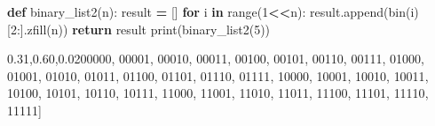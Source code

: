 \documentclass[
]{article}
\newenvironment{Shaded}{\begin{snugshade}}{\end{snugshade}}
\newcommand{\BuiltInTok}[1]{#1}
\newcommand{\ControlFlowTok}[1]{\textcolor[rgb]{0.13,0.29,0.53}{\textbf{#1}}}
\newcommand{\DecValTok}[1]{\textcolor[rgb]{0.00,0.00,0.81}{#1}}
\newcommand{\KeywordTok}[1]{\textcolor[rgb]{0.13,0.29,0.53}{\textbf{#1}}}
\newcommand{\NormalTok}[1]{#1}
\newcommand{\OperatorTok}[1]{\textcolor[rgb]{0.81,0.36,0.00}{\textbf{#1}}}
\newcommand{\StringTok}[1]{\textcolor[rgb]{0.31,0.60,0.02}{#1}}
\begin{document}
\begin{Shaded}
\begin{Highlighting}[]
\KeywordTok{def}\NormalTok{ binary\_list2(n):}
\NormalTok{    result }\OperatorTok{=}\NormalTok{ []}
    \ControlFlowTok{for}\NormalTok{ i }\KeywordTok{in} \BuiltInTok{range}\NormalTok{(}\DecValTok{1}\OperatorTok{\textless{}\textless{}}\NormalTok{n):}
\NormalTok{        result.append(}\BuiltInTok{bin}\NormalTok{(i)[}\DecValTok{2}\NormalTok{:].zfill(n))}
    \ControlFlowTok{return}\NormalTok{ result}
\BuiltInTok{print}\NormalTok{(binary\_list2(}\DecValTok{5}\NormalTok{))}
\end{Highlighting}
\end{Shaded}

\begin{Shaded}
\begin{Highlighting}[]
\NormalTok{[}\StringTok{\textquotesingle{}00000\textquotesingle{}}\NormalTok{, }\StringTok{\textquotesingle{}00001\textquotesingle{}}\NormalTok{, }\StringTok{\textquotesingle{}00010\textquotesingle{}}\NormalTok{, }\StringTok{\textquotesingle{}00011\textquotesingle{}}\NormalTok{, }\StringTok{\textquotesingle{}00100\textquotesingle{}}\NormalTok{, }\StringTok{\textquotesingle{}00101\textquotesingle{}}\NormalTok{, }\StringTok{\textquotesingle{}00110\textquotesingle{}}\NormalTok{, }\StringTok{\textquotesingle{}00111\textquotesingle{}}\NormalTok{, }\StringTok{\textquotesingle{}01000\textquotesingle{}}\NormalTok{, }\StringTok{\textquotesingle{}01001\textquotesingle{}}\NormalTok{, }\StringTok{\textquotesingle{}01010\textquotesingle{}}\NormalTok{, }\StringTok{\textquotesingle{}01011\textquotesingle{}}\NormalTok{, }\StringTok{\textquotesingle{}01100\textquotesingle{}}\NormalTok{, }\StringTok{\textquotesingle{}01101\textquotesingle{}}\NormalTok{, }\StringTok{\textquotesingle{}01110\textquotesingle{}}\NormalTok{, }\StringTok{\textquotesingle{}01111\textquotesingle{}}\NormalTok{, }\StringTok{\textquotesingle{}10000\textquotesingle{}}\NormalTok{, }\StringTok{\textquotesingle{}10001\textquotesingle{}}\NormalTok{, }\StringTok{\textquotesingle{}10010\textquotesingle{}}\NormalTok{, }\StringTok{\textquotesingle{}10011\textquotesingle{}}\NormalTok{, }\StringTok{\textquotesingle{}10100\textquotesingle{}}\NormalTok{, }\StringTok{\textquotesingle{}10101\textquotesingle{}}\NormalTok{, }\StringTok{\textquotesingle{}10110\textquotesingle{}}\NormalTok{, }\StringTok{\textquotesingle{}10111\textquotesingle{}}\NormalTok{, }\StringTok{\textquotesingle{}11000\textquotesingle{}}\NormalTok{, }\StringTok{\textquotesingle{}11001\textquotesingle{}}\NormalTok{, }\StringTok{\textquotesingle{}11010\textquotesingle{}}\NormalTok{, }\StringTok{\textquotesingle{}11011\textquotesingle{}}\NormalTok{, }\StringTok{\textquotesingle{}11100\textquotesingle{}}\NormalTok{, }\StringTok{\textquotesingle{}11101\textquotesingle{}}\NormalTok{, }\StringTok{\textquotesingle{}11110\textquotesingle{}}\NormalTok{, }\StringTok{\textquotesingle{}11111\textquotesingle{}}\NormalTok{]}
\end{Highlighting}
\end{Shaded}
\end{document}
